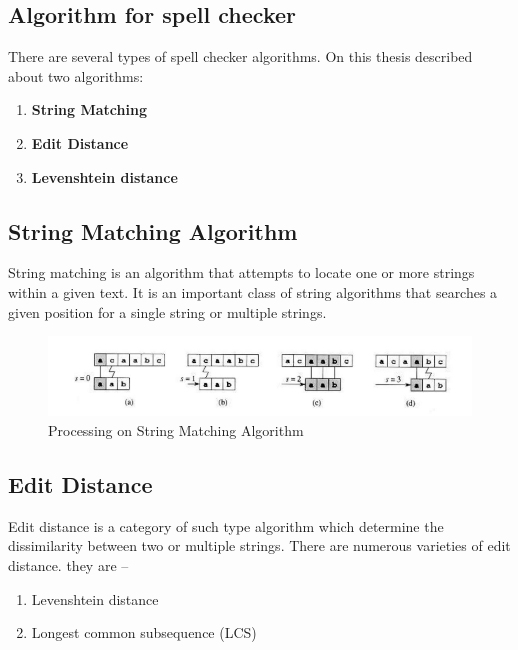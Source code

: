 \documentclass[12pt,letterpaper]{article}
\begin{document}
\begin{flushleft}
\section{Algorithm for spell checker}
There are several types of spell checker algorithms. On this thesis described about two
algorithms:\\
\begin{enumerate}
\item \textbf{String Matching}
\item \textbf{Edit Distance}
\item \textbf{Levenshtein distance}
\end{enumerate}
\subsection{String Matching Algorithm}
String matching is an algorithm that attempts to locate one or more strings within a given text. It is an
important class of string algorithms that searches a given position for a single string or multiple strings.\\
\begin{figure}[h]
  \centering
  \includegraphics[scale=0.8]{stringmatching.png}
  \caption{Processing on String Matching Algorithm}
  \label{fig:my_picture}
\end{figure}
\subsection{Edit Distance}
Edit distance is a category of such type algorithm which determine the dissimilarity between two or
multiple strings. There are numerous varieties of edit distance. they are –\\
\begin{enumerate}
\item Levenshtein distance
\item Longest common subsequence (LCS)
\end{enumerate}

\end{flushleft}
\end{document}
